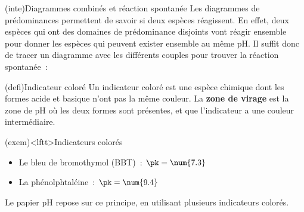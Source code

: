 \documentclass[../../main/main.tex]{subfiles}
\begin{document}
\begin{tcb*}(inte){Diagrammes combinés et réaction spontanée}
	Les diagrammes de prédominances permettent de savoir si deux espèces
	réagissent. En effet, deux espèces qui ont des domaines de prédominance
	disjoints vont réagir ensemble pour donner les espèces qui peuvent exister
	ensemble au même pH. Il suffit donc de tracer un diagramme avec les
	différents couples pour trouver la réaction spontanée~:
	\begin{center}
	\end{center}
\end{tcb*}

\begin{tcb*}(defi){Indicateur coloré}
	Un indicateur coloré est une espèce chimique dont les formes acide et basique
	n'ont pas la même couleur. La \textbf{zone de virage} est la zone de pH où les
	deux formes sont présentes, et que l'indicateur a une couleur intermédiaire.
\end{tcb*}
\begin{tcb*}(exem)<lftt>{Indicateurs colorés}
	\begin{itemize}
		\item Le bleu de bromothymol (BBT)~: $\pk = \num{7.3}$
		\item La phénolphtaléine~: $\pk = \num{9.4}$
	\end{itemize}
	Le papier pH repose sur ce principe, en utilisant plusieurs indicateurs
	colorés.
\end{tcb*}
\end{document}
